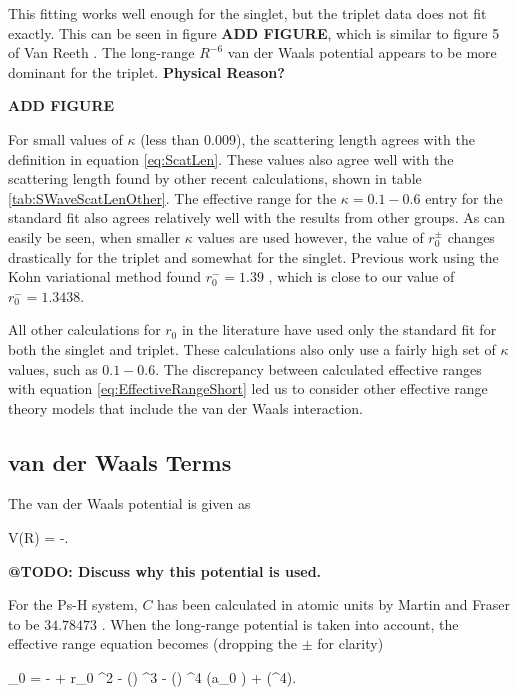 \documentclass[Dissertation.tex]{subfiles}
\begin{document}
This fitting works well enough for the singlet, but the triplet data does not fit exactly.  This can be seen in figure \textbf{ADD FIGURE}, which is similar to figure 5 of Van Reeth \cite{VanReeth2003}.  The long-range $R^{-6}$ van der Waals potential appears to be more dominant for the triplet. \textbf{Physical Reason?}

\textbf{ADD FIGURE}

For small values of $\kappa$ (less than 0.009), the scattering length agrees with the definition in equation \ref{eq:ScatLen}. These values also agree well with the scattering length found by other recent calculations, shown in table \ref{tab:SWaveScatLenOther}. The effective range for the $\kappa = 0.1 - 0.6$ entry for the standard fit also agrees relatively well with the results from other groups. As can easily be seen, when smaller $\kappa$ values are used however, the value of $r_0^\pm$ changes drastically for the triplet and somewhat for the singlet. Previous work using the Kohn variational method found $r_0^- = 1.39$ \cite{VanReeth2003}, which is close to our value of $r_0^- = 1.3438$.

All other calculations for $r_0$ in the literature have used only the standard fit for both the singlet and triplet. These calculations also only use a fairly high set of $\kappa$ values, such as $0.1 - 0.6$. The discrepancy between calculated effective ranges with equation \ref{eq:EffectiveRangeShort} led us to consider other effective range theory models that include the van der Waals interaction.

\subsection{van der Waals Terms}
\label{sec:vanderWaalsERT}

The van der Waals potential is given as

\beq
\label{eq:VanderWaals}
V(R) = -.
\eeq

\textbf{@TODO: Discuss why this potential is used.}

\noindent For the Ps-H system, $C$ has been calculated in atomic units by Martin and Fraser to be $34.78473$ \cite{Martin1980}. When the long-range potential is taken into account, the effective range equation becomes (dropping the $\pm$ for clarity) \cite[pg. 669]{Drake2006}

\beq
\label{eq:EffectiveRangeLong}
\kappa \cot\eta_0 = - +  r_0 \kappa^2 -  \left(\right) \kappa^3 -  \left(\right) \kappa^4 \ln \left(\kappa a_0 \right) + (\kappa^4).
\eeq
\end{document}
